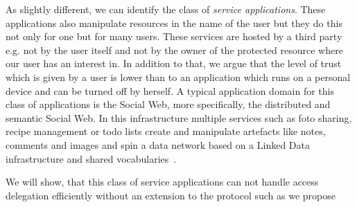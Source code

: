 \documentclass[a4paper]{llncs}
\begin{document}
As slightly different, we can identify the class of \textit{service applications}.
These applications also manipulate resources in the name of the user but they do this not only for one but for many users.
These services are hosted by a third party e.g. not by the user itself and not by the owner of the protected resource where our user has an interest in.
In addition to that, we argue that the level of trust which is given by a user is lower than to an application which runs on a personal device and can be turned off by herself.
A typical application domain for this class of applications is the Social Web, more specifically, the distributed and semantic Social Web.
In this infrastructure multiple services such as foto sharing, recipe management or todo lists create and manipulate artefacts like notes, comments and images and spin a data network based on a Linked Data infrastructure and shared vocabularies~\cite{tramp-s-2012--a}.

We will show, that this class of service applications can not handle access delegation efficiently without an extension to the protocol such as we propose





\end{document}
